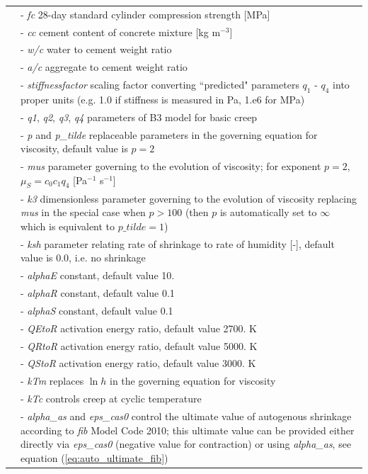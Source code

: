 \documentclass[a4paper]{article}
\newcommand{\param}[1]{{\it #1}}
\newenvironment{mmt}{\begin{tabular}{|l|p{9cm}|}}{\end{tabular}\\}
\newenvironment{mmt}{\begin{tabular}{|l|l|}}{\end{tabular}\\}
\begin{document}
\begin{table}[!htb]
\begin{mmt}
\hline
%
&- \param{fc} 28-day standard cylinder compression strength [MPa]\\
&- \param{cc} cement content of concrete mixture  [kg m$^{-3}$] \\
&- \param{w/c} water to cement weight ratio\\
&- \param{a/c} aggregate to cement weight ratio\\
&- \param{stiffnessfactor} scaling factor converting ``predicted" parameters $q_1$ - $q_4$ into proper units (e.g. 1.0 if stiffness is measured in Pa, 1.e6 for MPa)\\
&- \param{q1}, \param{q2}, \param{q3}, \param{q4} parameters of B3 model for basic creep\\
%
&- \param{p} and \param{p\_tilde} replaceable parameters in the governing equation for viscosity, default value is $p = 2$ \\
&- \param{mus} parameter governing to the evolution of viscosity; for exponent $p=2$, $\mu_S = c_0 c_1 q_4$ [Pa$^{-1}$ s$^{-1}$] \\
&- \param{k3} dimensionless parameter governing to the evolution of viscosity replacing \param{mus} in the special case when $p > 100$ (then $p$ is automatically set to $\infty$ which is equivalent to $p\_tilde = 1$)\\
&- \param{ksh} parameter relating rate of shrinkage to rate of humidity [-], default value is 0.0, i.e. no shrinkage\\
&- \param{alphaE} constant, default value 10.\\
&- \param{alphaR} constant, default value 0.1\\
&- \param{alphaS} constant, default value 0.1\\
&- \param{QEtoR} activation energy ratio, default value 2700. K\\
&- \param{QRtoR} activation energy ratio, default value 5000. K\\
&- \param{QStoR} activation energy ratio, default value 3000. K\\
&- \param{kTm} replaces $\ln{h}$ in the governing equation for viscosity\\
&- \param{kTc} controls creep at cyclic temperature \\
&- \param{alpha\_as} and \param{eps\_cas0} control the ultimate value of autogenous shrinkage according to {\sl{fib}} Model Code 2010; this ultimate value can be provided either directly via \param{eps\_cas0} (negative value for contraction) or  using \param{alpha\_as}, see equation (\ref{eq:auto_ultimate_fib})\\

\end{mmt}
\end{table}
\end{document}

